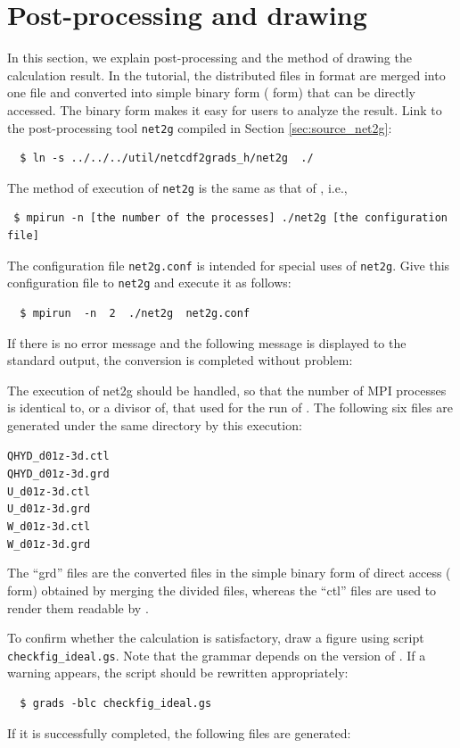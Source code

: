 \section{Post-processing and drawing} \label{sec:ideal_exp_net2g}
In this section, we explain post-processing and the method of drawing the calculation result.  In the tutorial, the distributed files in \netcdf format are merged into one file and converted into simple binary form ({\grads} form) that can be directly accessed. The binary form makes it easy for users to analyze the result. Link to the post-processing tool \verb|net2g| compiled  in Section \ref{sec:source_net2g}:
\begin{verbatim}
  $ ln -s ../../../util/netcdf2grads_h/net2g  ./
\end{verbatim}

The method of execution of \verb|net2g| is the same as that of \scalerm, i.e.,
\begin{verbatim}
 $ mpirun -n [the number of the processes] ./net2g [the configuration file] 
\end{verbatim}
The configuration file \verb|net2g.conf| is intended for special uses of \verb|net2g|.
Give this configuration file to \verb|net2g| and execute it as follows:
\begin{verbatim}
  $ mpirun  -n  2  ./net2g  net2g.conf
\end{verbatim}
If there is no error message and the following message is displayed to the standard output,
the conversion is completed without problem:

The execution of net2g should be handled,
so that the number of MPI processes is identical to, or a divisor of, that used for the run of \scalerm. The following six files are generated under the same directory by this execution:
\begin{alltt}
  QHYD_d01z-3d.ctl
  QHYD_d01z-3d.grd
  U_d01z-3d.ctl
  U_d01z-3d.grd
  W_d01z-3d.ctl
  W_d01z-3d.grd
\end{alltt}
The ``grd'' files are the converted files in the simple binary form of direct access
({\grads} form) obtained by merging the divided files,
whereas the ``ctl'' files are used to render them readable by \grads.

To confirm whether the calculation is satisfactory,
draw a figure using \grads script \verb|checkfig_ideal.gs|.
Note that the grammar depends on the version of \grads.
If a warning appears, the \grads script should be rewritten appropriately:
\begin{verbatim}
  $ grads -blc checkfig_ideal.gs
\end{verbatim}
If it is successfully completed, the following files are generated:

